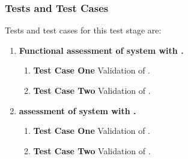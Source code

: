 \subsubsection{Tests and Test Cases}
\label{loc:TestsAndTestCases\TestIdName}

Tests and test cases for this test stage are:
\begin{enumerate}[itemindent=5pt,topsep=0pt,itemsep=0pt,partopsep=0pt, parsep=0pt]
	
	\item {\bf Functional assessment of system with \TBD.}
	\begin{enumerate}[itemindent=5pt,topsep=0pt,itemsep=0pt,partopsep=0pt, parsep=0pt]
		\item {\bf Test Case One} Validation of \TBD.
		\item {\bf Test Case Two} Validation of \TBD.
	\end{enumerate}
	
	\item {\bf \TBD assessment of system with \TBD.}
	\begin{enumerate}[itemindent=5pt,topsep=0pt,itemsep=0pt,partopsep=0pt, parsep=0pt]
		\item {\bf Test Case One} Validation of \TBD.
		\item {\bf Test Case Two} Validation of \TBD.
	\end{enumerate}
	
\end{enumerate}
